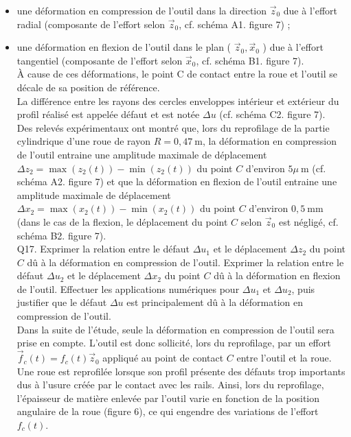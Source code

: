 \documentclass[10pt]{article}
\begin{document}
\begin{itemize}
  \item une déformation en compression de l'outil dans la direction $\vec{z}_{0}$ due à l'effort radial (composante de l'effort selon $\vec{z}_{0}$, cf. schéma A1. figure 7) ;
  \item une déformation en flexion de l'outil dans le plan ( $\vec{z}_{0}, \vec{x}_{0}$ ) due à l'effort tangentiel (composante de l'effort selon $\vec{x}_{0}$, cf. schéma B1. figure 7).\\
À cause de ces déformations, le point C de contact entre la roue et l'outil se décale de sa position de référence.\\
La différence entre les rayons des cercles enveloppes intérieur et extérieur du profil réalisé est appelée défaut et est notée $\Delta u$ (cf. schéma C2. figure 7).\\
Des relevés expérimentaux ont montré que, lors du reprofilage de la partie cylindrique d'une roue de rayon $R=0,47 \mathrm{~m}$, la déformation en compression de l'outil entraine une amplitude maximale de déplacement $\Delta z_{2}= \max \left(z_{2}(t)\right)-\min \left(z_{2}(t)\right)$ du point $C$ d'environ $5 \mu \mathrm{~m}$ (cf. schéma A2. figure 7) et que la déformation en flexion de l'outil entraine une amplitude maximale de déplacement $\Delta x_{2}=\max \left(x_{2}(t)\right)-\min \left(x_{2}(t)\right)$ du point $C$ d'environ $0,5 \mathrm{~mm}$ (dans le cas de la flexion, le déplacement du point $C$ selon $\vec{z}_{0}$ est négligé, cf. schéma B2. figure 7).\\
Q17. Exprimer la relation entre le défaut $\Delta u_{1}$ et le déplacement $\Delta z_{2}$ du point $C$ dû à la déformation en compression de l'outil. Exprimer la relation entre le défaut $\Delta u_{2}$ et le déplacement $\Delta x_{2}$ du point $C$ dû à la déformation en flexion de l'outil. Effectuer les applications numériques pour $\Delta u_{1}$ et $\Delta u_{2}$, puis justifier que le défaut $\Delta u$ est principalement dû à la déformation en compression de l'outil.\\
Dans la suite de l'étude, seule la déformation en compression de l'outil sera prise en compte. L'outil est donc sollicité, lors du reprofilage, par un effort $\vec{f}_{c}(t)=f_{c}(t) \vec{z}_{0}$ appliqué au point de contact $C$ entre l'outil et la roue. Une roue est reprofilée lorsque son profil présente des défauts trop importants dus à l'usure créée par le contact avec les rails. Ainsi, lors du reprofilage, l'épaisseur de matière enlevée par l'outil varie en fonction de la position angulaire de la roue (figure 6), ce qui engendre des variations de l'effort $f_{c}(t)$.
\end{itemize}
\end{document}
